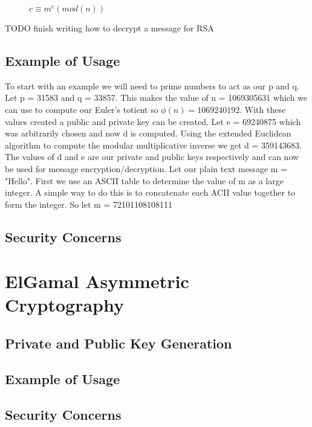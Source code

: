 \documentclass[conference]{IEEEtran}
\begin{document}
\begin{figure}[h]
	\begin{center}
		$c\equiv {m}^{e}\left(mod\left(n\right)\right)$
	\end{center}
\end{figure}

TODO finish writing how to decrypt a message for RSA


\subsection{Example of Usage}
To start with an example we will need to prime numbers to act as our p and q. Let p = 31583 and q = 33857. This makes the value of n = 1069305631 which we can use to compute our Euler's totient so $\phi \left(n\right) = 1069240192$. With these values created a public and private key can be created. Let e = 69240875 which was arbitrarily chosen and now d is computed. Using the extended Euclidean algorithm to compute the modular multiplicative inverse we get d = 359143683. The values of d and e are our private and public keys respectively and can now be used for message encryption/decryption. \newline
Let our plain text message m = "Hello". First we use an ASCII table to determine the value of m as a large integer. A simple way to do this is to concatenate each ACII value together to form the integer. So let m = 72101108108111 



\subsection{Security Concerns}

\section{ElGamal Asymmetric Cryptography}

\subsection{Private and Public Key Generation}

\subsection{Example of Usage}

\subsection{Security Concerns}
\end{document}
